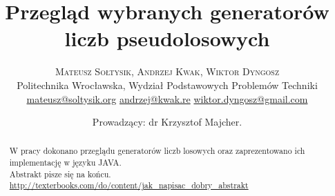 \documentclass[twoside]{article}
\title{\vspace{-15mm}\fontsize{24pt}{10pt}\selectfont\textbf{Przegląd wybranych generatorów liczb pseudolosowych}} %
\author{
\large
\textsc{Mateusz Sołtysik, Andrzej Kwak, Wiktor Dyngosz} \vspace{2mm} \\ %
\normalsize Politechnika Wrocławska, Wydział Podstawowych Problemów Techniki \vspace{2mm} \\ %
\normalsize
\href{mailto:mateusz@soltysik.org}{mateusz@soltysik.org} \hspace{1mm} %
\href{mailto:andrzej@kwak.re}{andrzej@kwak.re} \hspace{1mm} %
\href{mailto:wiktor.dyngosz@gmail.com}{wiktor.dyngosz@gmail.com} \\ %
}
\date{Prowadzący: dr Krzysztof Majcher.}
\begin{document}
\maketitle %

\thispagestyle{fancy} %


\begin{abstract}

\noindent W pracy dokonano przeglądu generatorów liczb losowych oraz zaprezentowano ich implementację w języku JAVA. 
\\Abstrakt pisze się na końcu. 
\url{http://texterbooks.com/do/content/jak_napisac_dobry_abstrakt}
\end{abstract}

\end{document}
